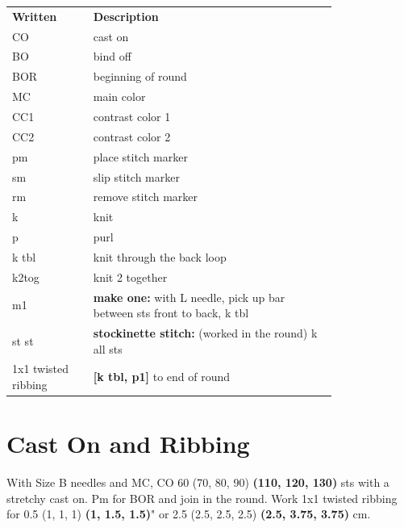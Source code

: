 \documentclass[12pt]{article}
\renewcommand{\arraystretch}{2} %
\renewcommand{\repeat}[1]{\textbf{[#1]}} %
\begin{document}
\begin{multicols}{2}
\begin{center}
{\renewcommand{\arraystretch}{1.1}
\begin{tabular}{| C{0.2\linewidth}  p{0.6\linewidth} | }
\thickhline {} 
\textbf{Written}	& \textbf{Description} \\ \thickhline
CO	& cast on \\
BO 	& bind off \\
BOR 	& beginning of round \\
MC 	& main color \\
CC1 	& contrast color 1 \\
CC2 	& contrast color 2 \\
pm	& place stitch marker \\
sm	& slip stitch marker \\
rm 	& remove stitch marker \\
k	& knit \\
p	& purl   \\
k tbl	& knit through the back loop \\
k2tog 	& knit 2 together \\
m1	& \textbf{make one:} with L needle, pick up bar between sts front to back, k tbl \\
st st 	& \textbf{stockinette stitch:} (worked in the round) k all sts \\
1x1 twisted ribbing 	& \repeat{k tbl, p1} to end of round \\
\hline
\end{tabular}
}
\end{center}
\normalsize

\section*{Cast On and Ribbing}

With Size B needles and MC, CO 60 (70, 80, 90) \textbf{(110, 120, 130)} sts with a stretchy cast on. Pm for BOR and join in the round. Work 1x1 twisted ribbing for 0.5 (1, 1, 1) \textbf{(1, 1.5, 1.5)}" or 2.5 (2.5, 2.5, 2.5) \textbf{(2.5, 3.75, 3.75)} cm.


\end{multicols}
\end{document}
